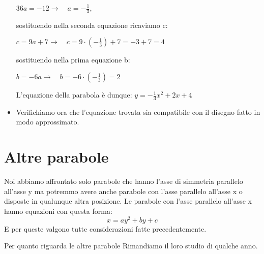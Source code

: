 \begin{esempio}
\begin{itemize}
$36a=-12 \rightarrow \quad a=-\frac{1}{3}$, 

sostituendo nella seconda equazione ricaviamo c:

$c= 9a+7 \rightarrow \quad c=9 \cdot \left(- \frac{1}{3} \right) +7=-3+7=4$

sostituendo nella prima equazione b:

$b=-6a \rightarrow \quad b=-6 \cdot \left(- \frac{1}{3} \right)=2$

L'equazione della parabola è dunque: $y=-\frac{1}{3}x^2+2x+4$

  \item Verifichiamo ora che l'equazione trovata sia compatibile con il disegno 
  fatto in modo approssimato.
 \end{itemize}
\end{esempio}


\section{Altre parabole}
\label{sec:parabola_altreparabole}

Noi abbiamo affrontato solo parabole che hanno l'asse di simmetria parallelo 
all'asse y ma potremmo avere anche parabole con l'asse parallelo all'asse x
o disposte in qualunque altra posizione.
Le parabole con l'asse parallelo all'asse x hanno equazioni con questa forma:
\[x=ay^2+by+c\]
E per queste valgono tutte considerazioni fatte precedentemente.

Per quanto riguarda le altre parabole Rimandiamo il loro studio di qualche 
anno.
